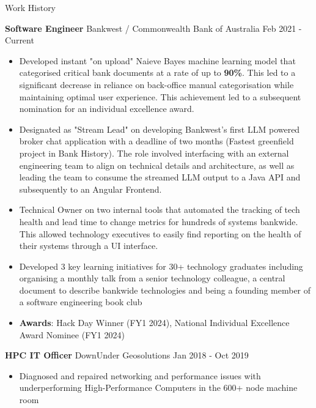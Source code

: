 \documentclass{resume} %
\begin{document}
	\begin{rSection}{Work History}
		\vspace{-0.8em}
		\item \textbf{Software Engineer} {Bankwest / Commonwealth Bank of Australia} \hfill Feb 2021 - Current
		\begin{itemize} 
			\item Developed instant "on upload" Naieve Bayes machine learning model that categorised critical bank documents at a rate of up to \textbf{90\%}. This led to a significant decrease in reliance on back-office manual categorisation while maintaining optimal user experience. This achievement led to a subsequent nomination for an individual excellence award.
			\item Designated as "Stream Lead" on developing Bankwest's first LLM powered broker chat application with a deadline of two months (Fastest greenfield project in Bank History). The role involved interfacing with an external engineering team to align on technical details and architecture, as well as leading the team to consume the streamed LLM output to a Java API and subsequently to an Angular Frontend.
			\item Technical Owner on two internal tools that automated the tracking of tech health and lead time to change metrics
for hundreds of systems bankwide. This allowed technology executives to easily find reporting on the health of their systems
through a UI interface.		
			\item Developed 3 key learning initiatives for 30+ technology graduates including organising a monthly talk from
a senior technology colleague, a central document to describe bankwide technologies and being a founding
member of a software engineering book club
			\item \textbf{Awards}: Hack Day Winner (FY1 2024), National Individual Excellence Award Nominee (FY1 2024) 
		\end{itemize}
		
		\item \textbf{HPC IT Officer} {DownUnder Geosolutions} \hfill Jan 2018 - Oct 2019
		\begin{itemize} 

			\item  Diagnosed and repaired networking and performance issues with underperforming High-Performance Computers in the 600+ node machine room
		\end{itemize}

	\end{rSection} 
\end{document}
